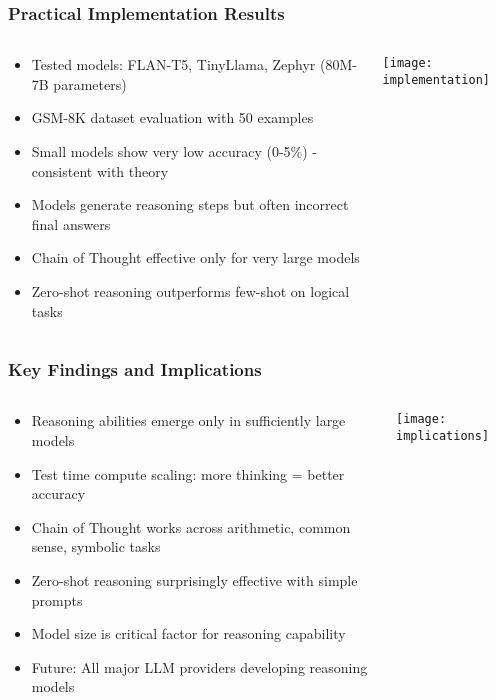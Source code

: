 \begin{frame}[fragile]\frametitle{Practical Implementation Results}
\begin{columns}
    \begin{column}[T]{0.6\linewidth}
      \begin{itemize}
        \item Tested models: FLAN-T5, TinyLlama, Zephyr (80M-7B parameters)
        \item GSM-8K dataset evaluation with 50 examples
        \item Small models show very low accuracy (0-5\%) - consistent with theory
        \item Models generate reasoning steps but often incorrect final answers
        \item Chain of Thought effective only for very large models
        \item Zero-shot reasoning outperforms few-shot on logical tasks
      \end{itemize}
    \end{column}
    \begin{column}[T]{0.4\linewidth}
        \begin{center}
        \texttt{[image: implementation]}
        \end{center}	
    \end{column}
  \end{columns}
\end{frame}

\begin{frame}[fragile]\frametitle{Key Findings and Implications}
\begin{columns}
    \begin{column}[T]{0.6\linewidth}
      \begin{itemize}
        \item Reasoning abilities emerge only in sufficiently large models
        \item Test time compute scaling: more thinking = better accuracy
        \item Chain of Thought works across arithmetic, common sense, symbolic tasks
        \item Zero-shot reasoning surprisingly effective with simple prompts
        \item Model size is critical factor for reasoning capability
        \item Future: All major LLM providers developing reasoning models
      \end{itemize}
    \end{column}
    \begin{column}[T]{0.4\linewidth}
        \begin{center}
        \texttt{[image: implications]}
        \end{center}	
    \end{column}
  \end{columns}
\end{frame}